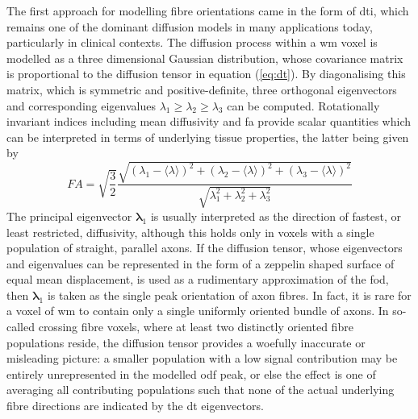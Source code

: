 The first approach for modelling fibre orientations came in the form of \gls{dti}, which remains one of the dominant diffusion models in many applications today, particularly in clinical contexts.
The diffusion process within a \gls{wm} voxel is modelled as a three dimensional Gaussian distribution, whose covariance matrix is proportional to the diffusion tensor\autocite{Basser1994,ODonnell2011} in equation (\ref{eq:dt}).
By diagonalising this matrix, which is symmetric and positive-definite, three orthogonal eigenvectors and corresponding eigenvalues $\lambda_1 \geqslant \lambda_2 \geqslant \lambda_3$ can be computed.
Rotationally invariant indices including mean diffusivity and \gls{fa} provide scalar quantities which can be interpreted in terms of underlying tissue properties, the latter being given by
\begin{equation}
  FA = \sqrt{\frac{3}{2}}\frac{\sqrt{(\lambda_1 - \langle \lambda \rangle)^2 + (\lambda_2 - \langle \lambda \rangle)^2 + (\lambda_3 - \langle \lambda \rangle)^2}}{\sqrt{\lambda_1^2 + \lambda_2^2+ \lambda_3^2}}
\end{equation}
The principal eigenvector $\bm{\lambda}_1$ is usually interpreted as the direction of fastest, or least restricted, diffusivity, although this holds only in voxels with a single population of straight, parallel axons.
If the diffusion tensor, whose eigenvectors and eigenvalues can be represented in the form of a zeppelin shaped surface of equal mean displacement, is used as a rudimentary approximation of the \gls{fod}, then $\bm{\lambda}_1$ is taken as the single peak orientation of axon fibres.
In fact, it is rare for a voxel of \gls{wm} to contain only a single uniformly oriented bundle of axons.
In so-called crossing fibre voxels, where at least two distinctly oriented fibre populations reside, the diffusion tensor provides a woefully inaccurate or misleading picture: a smaller population with a low signal contribution may be entirely unrepresented in the modelled \gls{odf} peak, or else the effect is one of averaging all contributing populations such that none of the actual underlying fibre directions are indicated by the \gls{dt} eigenvectors. 

